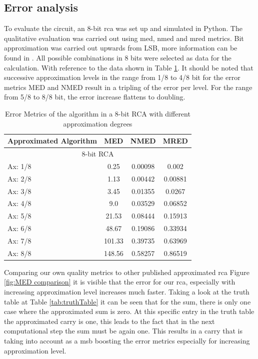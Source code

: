 \documentclass[]{IEEEtran}
\begin{document}
\subsection{Error analysis}
To evaluate the circuit, an 8-bit \gls{rca} was set up and simulated in Python. The qualitative evaluation was carried out using \gls{med}, \gls{nmed} and \gls{mred} metrics. Bit approximation was carried out upwards from LSB, more information can be found in \cite{9271703}. All possible combinations in 8 bits were selected as data for the calculation. With reference to the data shown in Table \ref{tab:errorAnalysis}. It should be noted that successive approximation levels in the range from 1/8 to 4/8 bit for the error metrics MED and NMED result in a tripling of the error per level. For the range from 5/8 to 8/8 bit, the error increase flattens to doubling.
\begin{table}[h]
\caption{Error Metrics of the algorithm in a 8-bit RCA with different approximation degrees}
\centering
\begin{tabular}{|p{1.5cm}|c|c|c|}
\hline
 Approximated Algorithm & \multicolumn{1}{|c|}{\multirow{2}{*}{MED}} & \multicolumn{1}{|c|}{\multirow{2}{*}{NMED}} & \multicolumn{1}{|c|}{\multirow{2}{*}{MRED}}  \\ \hline
 \multicolumn{4}{|c|}{8-bit  RCA} \\ \hline \addlinespace[1ex] \hline
 Ax: 1/8 & 0.25 & 0.00098 & 0.002 \\ \hline
 Ax: 2/8 & 1.13 & 0.00442 & 0.00881 \\ \hline
 Ax: 3/8 & 3.45 & 0.01355 & 0.0267 \\ \hline
 Ax: 4/8 & 9.0 & 0.03529 & 0.06852 \\ \hline
 Ax: 5/8 & 21.53 & 0.08444 & 0.15913 \\ \hline
 Ax: 6/8 & 48.67 & 0.19086 & 0.33934 \\ \hline
 Ax: 7/8 & 101.33 & 0.39735 & 0.63969 \\ \hline
 Ax: 8/8 & 148.56 & 0.58257 & 0.86519 \\ \hline
\end{tabular}
\label{tab:errorAnalysis}
\end{table}

Comparing our own quality metrics to other published approximated \gls{rca} Figure \ref{fig:MED comparison} it is visible that the error for our \gls{rca}, especially with increasing approximation level increases much faster. Taking a look at the truth table at Table \ref{tab:truthTable} it can be seen that for the sum, there is only one case where the approximated sum is zero. At this specific entry in the truth table the approximated carry is one, this leads to the fact that in the next computational step the sum must be again one. This results in a carry that is taking into account as a \gls{msb} boosting the error metrics especially for increasing approximation level.
\end{document}
